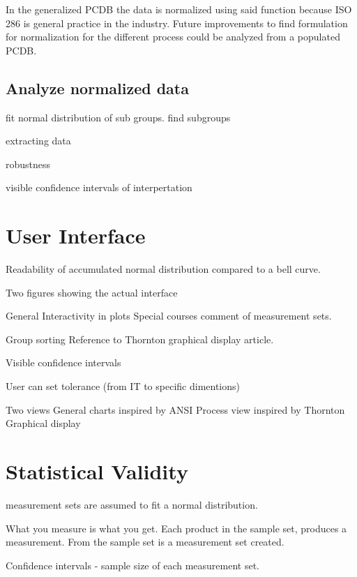 \documentclass[aip,amsmath, reprint, author-year]{revtex4-1}
\begin{document}
In the generalized PCDB the data is normalized using said function because ISO 286 is general practice in the industry. Future improvements to find formulation for normalization for the different process could be analyzed from a populated PCDB.

\subsection{Analyze normalized data}



fit normal distribution of sub groups.
find subgroups

extracting data

robustness 



visible confidence intervals of interpertation


\section{User Interface}

Readability of accumulated normal distribution compared to a bell curve.

Two figures showing the actual interface

General
	Interactivity in plots 
		Special courses comment of measurement sets.
	
	Group sorting
		Reference to Thornton graphical display article.

	Visible confidence intervals

	User can set tolerance (from IT to specific dimentions)

Two views
	General charts inspired by ANSI
	Process view inspired by Thornton Graphical display


\section{Statistical Validity}

measurement sets are assumed to fit a normal distribution.

What you measure is what you get.
Each product in the sample set, produces a measurement. From the sample set is a  measurement set created. 

Confidence intervals - sample size of each measurement set.
\end{document}
